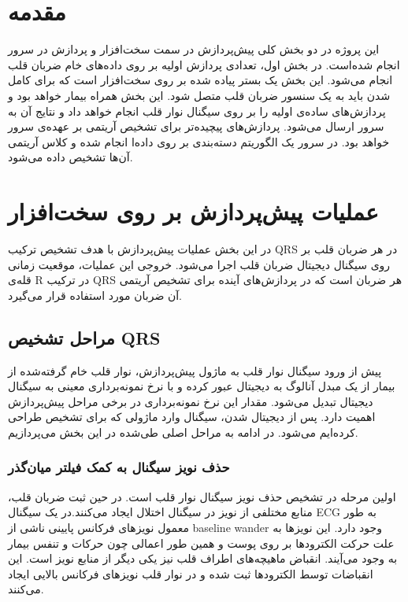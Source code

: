 
\pagebreak

\section{مقدمه}
 این پروژه در دو بخش کلی پیش‌پردازش در سمت سخت‌افزار و پردازش در سرور انجام شده‌است. در بخش اول، تعدادی پردازش اولیه بر روی داده‌های خام ضربان قلب انجام می‌شود. این بخش یک بستر پیاده شده بر روی سخت‌افزار است که برای کامل شدن باید به یک سنسور ضربان قلب متصل شود. این بخش همراه بیمار خواهد بود و پردازش‌های ساده‌ی اولیه را بر روی سیگنال نوار قلب انجام خواهد داد و نتایج آن به سرور ارسال می‌شود.  پردازش‌های پیچیده‌تر برای تشخیص آریتمی بر عهده‌ی سرور خواهد بود. در سرور یک الگوریتم دسته‌بندی بر روی داده‌ا انجام شده و کلاس آریتمی آن‌ها تشخیص داده می‌شود.

\section{عملیات پیش‌پردازش بر روی سخت‌افزار} 
در این بخش عملیات پیش‌پردازش با هدف تشخیص ترکیب QRS در هر ضربان قلب بر روی سیگنال دیجیتال ضربان قلب اجرا می‌شود. خروجی این عملیات، موقعیت زمانی قله‌ی R در ترکیب QRS هر ضربان است که در پردازش‌های آینده برای تشخیص آریتمی آن ضربان مورد استفاده قرار می‌گیرد.

	\subsection{مراحل تشخیص QRS}
	
	پیش از ورود سیگنال نوار قلب به ماژول پیش‌پردازش، نوار قلب خام گرفته‌شده از بیمار  از یک مبدل آنالوگ به دیجیتال عبور کرده و با نرخ نمونه‌برداری معینی به سیگنال دیجیتال تبدیل می‌شود. مقدار این نرخ نمونه‌برداری در برخی مراحل پیش‌پردازش اهمیت دارد. 
پس از دیجیتال شدن، سیگنال وارد ماژولی که برای تشخیص  طراحی کرده‌ایم می‌شود. در ادامه به مراحل اصلی طی‌شده در این بخش می‌پردازیم.
		\subsubsection{حذف نویز سیگنال به کمک فیلتر میان‌گذر}
		اولین مرحله در تشخیص  حذف نویز سیگنال نوار قلب است. در حین ثبت ضربان قلب، منابع مختلفی از نویز در سیگنال اختلال ایجاد می‌کنند.در یک سیگنال ECG به طور معمول نویزهای فرکانس پایینی ناشی از baseline wander وجود دارد. این نویزها به علت حرکت الکترودها بر روی پوست و همین طور اعمالی چون حرکات و تنفس بیمار به وجود می‌آیند. انقباض ماهیچه‌های اطراف قلب نیز یکی دیگر از منابع نویز است. این انقباضات توسط الکترودها ثبت شده و در نوار قلب نویزهای فرکانس بالایی ایجاد می‌کنند.\cite{Joshi2013}
		
